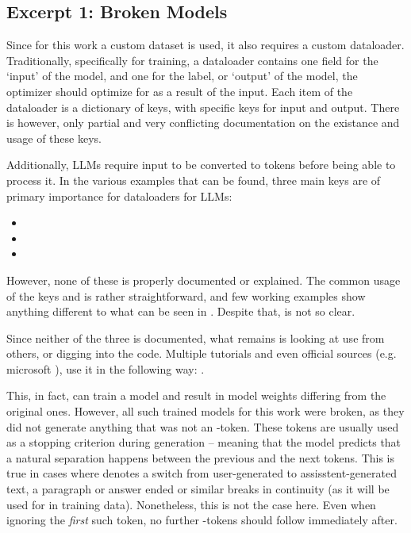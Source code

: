 \subsection{Excerpt 1: Broken Models}\label{sub:brokenft}
Since for this work a custom dataset is used, it also requires a custom dataloader.
Traditionally, specifically for training, a dataloader contains one field for the `input' of the model, and one for the label, or `output' of the model, the optimizer should optimize for as a result of the input.
Each item of the dataloader is a dictionary of keys, with specific keys for input and output.
There is however, only partial and very conflicting documentation on the existance and usage of these keys.

Additionally, \glspl{LLM} require input to be converted to tokens before being able to process it.
In the various examples that can be found, three main keys are of primary importance for dataloaders for \glspl{LLM}:

\begin{itemize}
    \item {}
    \item {}
    \item {}
\end{itemize}


However, none of these is properly documented or explained.
The common usage of the keys  and  is rather straightforward, and few working examples show anything different to what can be seen in .
Despite that,  is not so clear.

Since neither of the three is documented, what remains is looking at use from others, or digging into the code.
Multiple tutorials and even official sources (e.g. \gls{microsoft} \cite{deepspeedexamples_2023}), use it in the following way: .

This, in fact, can train a model and result in model weights differing from the original ones.
However, all such trained models for this work were broken, as they did not generate anything that was not an -token.
These tokens are usually used as a stopping criterion during generation -- meaning that the model predicts that a natural separation happens between the previous and the next tokens.
This is true in cases where  denotes a switch from user-generated to assisstent-generated text, a paragraph or answer ended or similar breaks in continuity (as it will be used for in training data).
Nonetheless, this is not the case here. Even when ignoring the \textit{first} such token, no further -tokens should follow immediately after.

